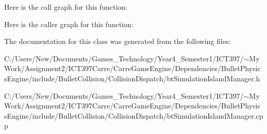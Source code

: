 Here is the call graph for this function:

Here is the caller graph for this function:

The documentation for this class was generated from the following files:\begin{CompactItemize}
\item 
C:/Users/New/Documents/Games\_\-Technology/Year4\_\-Semester1/ICT397/$\sim$My Work/Assignment2/ICT397Carre/CarreGameEngine/Dependencies/BulletPhysicsEngine/include/BulletCollision/CollisionDispatch/btSimulationIslandManager.h\item 
C:/Users/New/Documents/Games\_\-Technology/Year4\_\-Semester1/ICT397/$\sim$My Work/Assignment2/ICT397Carre/CarreGameEngine/Dependencies/BulletPhysicsEngine/include/BulletCollision/CollisionDispatch/btSimulationIslandManager.cpp\end{CompactItemize}
